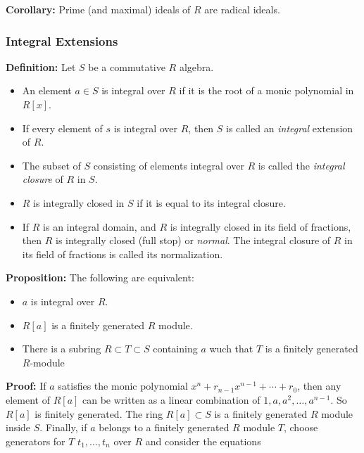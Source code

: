 \documentclass[]{article}
\providecommand{\tightlist}{%
  \setlength{\itemsep}{0pt}\setlength{\parskip}{0pt}}
\begin{document}
\textbf{Corollary:} Prime (and maximal) ideals of \(R\) are radical
ideals.

\hypertarget{integral-extensions}{%
\subsubsection{Integral Extensions}\label{integral-extensions}}

\textbf{Definition:} Let \(S\) be a commutative \(R\) algebra.

\begin{itemize}
\tightlist
\item
  An element \(a\in S\) is integral over \(R\) if it is the root of a
  monic polynomial in \(R[x]\).
\item
  If every element of \(s\) is integral over \(R\), then \(S\) is called
  an \emph{integral} extension of \(R\).
\item
  The subset of \(S\) consisting of elements integral over \(R\) is
  called the \emph{integral closure} of \(R\) in \(S\).
\item
  \(R\) is integrally closed in \(S\) if it is equal to its integral
  closure.
\item
  If \(R\) is an integral domain, and \(R\) is integrally closed in its
  field of fractions, then \(R\) is integrally closed (full stop) or
  \emph{normal}. The integral closure of \(R\) in its field of fractions
  is called its normalization.
\end{itemize}

\textbf{Proposition:} The following are equivalent:

\begin{itemize}
\tightlist
\item
  \(a\) is integral over \(R\).
\item
  \(R[a]\) is a finitely generated \(R\) module.
\item
  There is a subring \(R\subset T\subset S\) containing \(a\) wuch that
  \(T\) is a finitely generated \(R\)-module
\end{itemize}

\textbf{Proof:} If \(a\) satisfies the monic polynomial
\(x^n+r_{n-1}x^{n-1}+\cdots+r_0\), then any element of \(R[a]\) can be
written as a linear combination of \(1,a,a^2,\ldots, a^{n-1}\). So
\(R[a]\) is finitely generated. The ring \(R[a]\subset S\) is a finitely
generated \(R\) module inside \(S\). Finally, if \(a\) belongs to a
finitely generated \(R\) module \(T\), choose generators for \(T\)
\(t_1,\ldots, t_n\) over \(R\) and consider the equations
\end{document}
